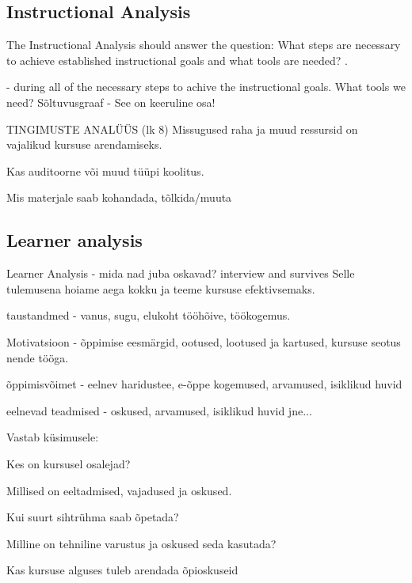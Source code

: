 \subsection{Instructional Analysis}
The Instructional Analysis should answer the question: What steps are necessary to achieve  established instructional goals and what tools are needed? \citep{website:addie}.

 - during all of the necessary steps to achive the instructional goals. What tools we need? Sõltuvusgraaf - See on keeruline osa!




{\color{red} TINGIMUSTE ANALÜÜS (lk 8)
Missugused raha ja muud ressursid on vajalikud kursuse arendamiseks.

Kas auditoorne või muud tüüpi koolitus.

Mis materjale saab kohandada, tõlkida/muuta

}






%
%
%
%
%



\subsection{Learner analysis}

Learner Analysis - mida nad juba oskavad? interview and survives Selle tulemusena hoiame aega kokku ja teeme kursuse efektivsemaks. 


{\color{red}
taustandmed - vanus, sugu, elukoht tööhõive, töökogemus.

Motivatsioon - õppimise eesmärgid, ootused, lootused ja kartused, kursuse seotus nende tööga.

õppimisvõimet - eelnev haridustee, e-õppe kogemused, arvamused, isiklikud huvid 

eelnevad teadmised - oskused, arvamused, isiklikud huvid jne...
\citep{OppeArenduskeskus2010}


Vastab küsimusele:

Kes on kursusel osalejad?

Millised on eeltadmised, vajadused ja oskused.

Kui suurt sihtrühma saab õpetada?

Milline on tehniline varustus ja oskused seda kasutada?

Kas kursuse alguses tuleb arendada õpioskuseid

\citep{OppeArenduskeskus2010}
}


